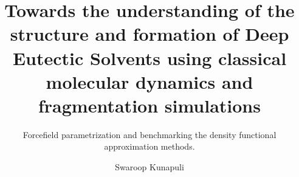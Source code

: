 \documentclass{customformat}
\begin{document}
\author{Swaroop Kunapuli}
\title{Towards the understanding of the structure and formation of Deep Eutectic Solvents using classical molecular dynamics and fragmentation simulations}
\subtitle{Forcefield parametrization and benchmarking the density functional approximation methods.}

\maketitle
\newpage
\tableofcontents
\newpage






\end{document}
